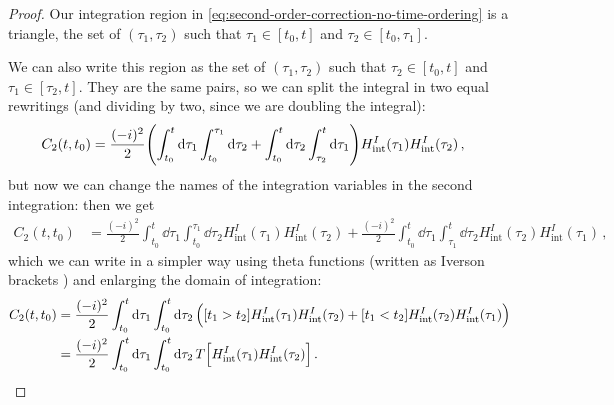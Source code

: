 \documentclass[main.tex]{subfiles}
\begin{document}
\begin{proof}
Our integration region in \eqref{eq:second-order-correction-no-time-ordering} is a triangle, the set of \((\tau_1 , \tau_2 )\) such that \(\tau_1 \in [t_0 , t]\) and \(\tau_2 \in [t_0, \tau_1 ]\). 

We can also write this region as the set of \((\tau_1 , \tau_2 )\) such that \(\tau_2 \in [t_0 , t]\) and \(\tau_1 \in [\tau_2, t]\). They are the same pairs, so we can split the integral in two equal rewritings (and dividing by two, since we are doubling the integral): 
%
\begin{align}
C_2 (t, t_0 )
&= \frac{(-i)^2}{2} \qty(\int_{t_0}^{t} \dd{\tau_1 } \int_{t_0 }^{\tau_1 } \dd{\tau_2 }
+ \int_{t_0 }^{t} \dd{\tau_2 } \int_{\tau_2}^{t} \dd{\tau_1 }
)
H _{\text{int}}^{I} (\tau_1 ) 
H _{\text{int}}^{I} (\tau_2 ) 
\,,
\end{align}
%
but now we can change the names of the integration variables in the second integration: then we get 
%
\begin{align}
C_2 (t, t_0 )
&= \frac{(-i)^2}{2} \int_{t_0}^{t} \dd{\tau_1 } \int_{t_0 }^{\tau_1 } \dd{\tau_2 }
H _{\text{int}}^{I} (\tau_1 )
H _{\text{int}}^{I} (\tau_2 )
+ \frac{(-i)^2}{2} \int_{t_0 }^{t} \dd{\tau_1 } \int_{\tau_1}^{t} \dd{\tau_2 }
H _{\text{int}}^{I} (\tau_2 )
H _{\text{int}}^{I} (\tau_1 )
\,,
\end{align}
%
which we can write in a simpler way using theta functions (written as Iverson brackets \cite[]{knuthTwoNotesNotation1992}) and enlarging the domain of integration: 
%
\begin{subequations}
\begin{align}
C_2 (t, t_0 ) &=
\frac{(-i)^2}{2} \int_{t_0 }^{t} \dd{\tau_1 } \int_{t_0 }^{t} \dd{\tau_2 
}
\qty([t_1 > t_2  ] H _{\text{int}}^{I} (\tau_1 )
H _{\text{int}}^{I} (\tau_2 ) 
+ [t_1 < t_2 ] H _{\text{int}}^{I} (\tau_2 )
H _{\text{int}}^{I} (\tau_1 ) )  \\
&= \frac{(-i)^2}{2} \int_{t_0 }^{t} \dd{\tau_1 } \int_{t_0 }^{t} \dd{\tau_2 }
T \qty[H _{\text{int}}^{I} (\tau_1 )
H _{\text{int}}^{I} (\tau_2 )]
\,.
\end{align}
\end{subequations}
\end{proof}
\end{document}
